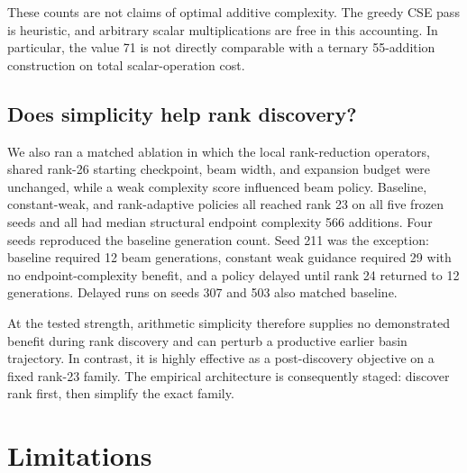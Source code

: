 \documentclass[11pt]{article}
\begin{document}
These counts are not claims of optimal additive complexity.  The greedy CSE pass is heuristic, and arbitrary scalar multiplications are free in this accounting.  In particular, the value 71 is not directly comparable with a ternary 55-addition construction on total scalar-operation cost.

\subsection{Does simplicity help rank discovery?}

We also ran a matched ablation in which the local rank-reduction operators, shared rank-26 starting checkpoint, beam width, and expansion budget were unchanged, while a weak complexity score influenced beam policy.  Baseline, constant-weak, and rank-adaptive policies all reached rank 23 on all five frozen seeds and all had median structural endpoint complexity 566 additions.  Four seeds reproduced the baseline generation count.  Seed 211 was the exception: baseline required 12 beam generations, constant weak guidance required 29 with no endpoint-complexity benefit, and a policy delayed until rank 24 returned to 12 generations.  Delayed runs on seeds 307 and 503 also matched baseline.

At the tested strength, arithmetic simplicity therefore supplies no demonstrated benefit during rank discovery and can perturb a productive earlier basin trajectory.  In contrast, it is highly effective as a post-discovery objective on a fixed rank-23 family.  The empirical architecture is consequently staged: discover rank first, then simplify the exact family.

\section{Limitations}
\end{document}
